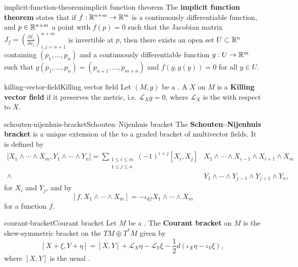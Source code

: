 \begin{topic}{implicit-function-theorem}{implicit function theorem}
    The \textbf{implicit function theorem} states that if $f : \mathbb{R}^{n + m} \to \mathbb{R}^m$ is a continuously differentiable function, and $p \in \mathbb{R}^{n + m}$ a point with $f(p) = 0$ such that the Jacobian matrix $J_f = \left(\frac{\partial f_i}{\partial x_j}\right)_{i,j = n + 1}^{n + m}$ is invertible at $p$, then there exists an open set $U \subset \mathbb{R}^n$ containing $(p_1, \ldots, p_n)$ and a continuously differentiable function $g : U \to \mathbb{R}^m$ such that $g(p_1, \ldots, p_n) = (p_{n + 1}, \ldots, p_{m + n})$ and $f(y, g(y)) = 0$ for all $y \in U$.
\end{topic}

\begin{topic}{killing-vector-field}{Killing vector field}
    Let $(M, g)$ be a . A  $X$ on $M$ is a \textbf{Killing vector field} if it preserves the metric, i.e. $\mathcal{L}_X g = 0$, where $\mathcal{L}_X$ is the  with respect to $X$.
\end{topic}

\begin{topic}{schouten-nijenhuis-bracket}{Schouten--Nijenhuis bracket}
    The \textbf{Schouten--Nijenhuis bracket} is a unique extension of the  to a graded bracket of multivector fields. It is defined by
    \[ \begin{aligned} {[}X_1 \wedge \cdots \wedge X_m, Y_1 \wedge \cdots \wedge Y_n{]} = \sum_{\substack{1 \le i \le m \\ 1 \le j \le n}} (-1)^{i + j} [X_i, X_j] &X_1 \wedge \cdots \wedge X_{i - 1} \wedge X_{i + 1} \wedge X_m \\ \wedge &Y_1 \wedge \cdots \wedge Y_{j - 1} \wedge Y_{j + 1} \wedge Y_n , \end{aligned} \]
    for  $X_i$ and $Y_j$, and by
    \[ [f, X_1 \wedge \cdots \wedge X_m] = -\iota_{df} X_1 \wedge \cdots \wedge X_m \]
    for a function $f$.
\end{topic}

\begin{topic}{courant-bracket}{Courant bracket}
    Let $M$ be a . The \textbf{Courant bracket} on $M$ is the skew-symmetric bracket on the  $TM \oplus T^*M$ given by
    \[ [X + \xi, Y + \eta] = [X, Y] + \mathcal{L}_X \eta - \mathcal{L}_Y \xi - \frac{1}{2} d \left(\iota_X \eta - \iota_Y \xi \right) , \]
    where $[X, Y]$ is the usual .
\end{topic}

